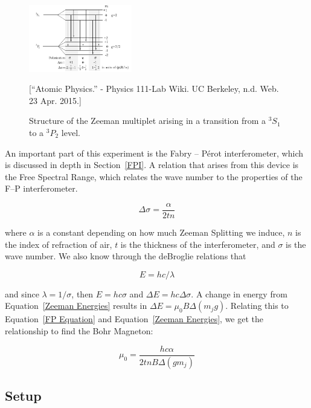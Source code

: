 \begin{figure}[t]
  \includegraphics[width = 0.4\textwidth]{ZeemanSplitting.png}
  \begin{center}
  \caption{Structure of the Zeeman multiplet arising in a transition from a $^{3}S_1$ to a $^{3}P_2$ level.}[\footnotesize{``Atomic Physics.'' - Physics 111-Lab Wiki. UC Berkeley, n.d. Web. 23 Apr. 2015.}]
  \label{ZeemanSplitting}
  \end{center}
\end{figure}

An important part of this experiment is the Fabry -- P\'{e}rot interferometer, which is discussed in depth in Section~\ref{FPI}. A relation that arises from this device is the Free Spectral Range, which relates the wave number to the properties of the F--P interferometer. 

\begin{equation} 
  \Delta \sigma = \frac{\alpha}{2tn}
  \label{FP Equation}
\end{equation}

where $\alpha$ is a constant depending on how much Zeeman Splitting we induce, $n$ is the index of refraction of air, $t$ is the thickness of the interferometer, and $\sigma$ is the wave number. We also know through the deBroglie relations that 

\begin{equation}
  E = hc/\lambda 
  \label{deBroglie}
\end{equation}

and since $\lambda = 1 / \sigma$, then $E = hc\sigma$ and $\Delta E = hc \Delta \sigma$. A change in energy from Equation~\ref{Zeeman Energies} results in $\Delta E = \mu_0 B \Delta (m_j g)$. Relating this to Equation~\ref{FP Equation} and Equation~\ref{Zeeman Energies}, we get the relationship to find the Bohr Magneton:

\begin{equation}
  \mu_0 = \frac{h c \alpha}{2 t n B \Delta(g m_j)}
  \label{Bohr Magneton}
\end{equation}

\subsection{Setup}

